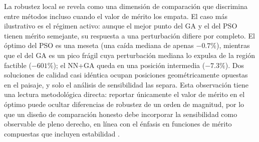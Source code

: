 La robustez local se revela como una dimensión de comparación que discrimina entre
métodos incluso cuando el valor de mérito los empata. El caso más ilustrativo es el
régimen activo: aunque el mejor punto del GA y el del PSO tienen mérito semejante, su
respuesta a una perturbación difiere por completo. El óptimo del PSO es una meseta (una
caída mediana de apenas $-0.7\%$), mientras que el del GA es un pico frágil cuya
perturbación mediana lo expulsa de la región factible ($-601\%$); el NN+GA queda en una
posición intermedia ($-7.3\%$). Dos soluciones de calidad casi idéntica ocupan posiciones
geométricamente opuestas en el paisaje, y solo el análisis de sensibilidad las separa.
Esta observación tiene una lectura metodológica directa: reportar únicamente el valor de
mérito en el óptimo puede ocultar diferencias de robustez de un orden de magnitud, por lo
que un diseño de comparación honesto debe incorporar la sensibilidad como observable de
pleno derecho, en línea con el énfasis en funciones de mérito compuestas que incluyen
estabilidad \cite{Woodward2016}.

